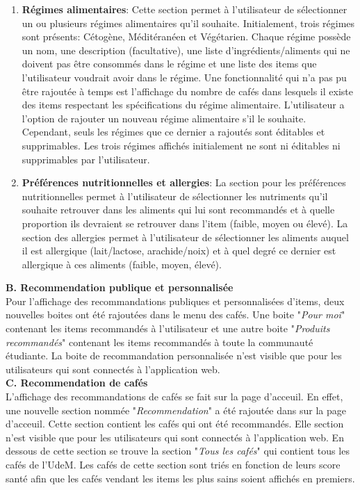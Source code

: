 \documentclass[11pt]{article}
\begin{document}
\begin{enumerate}
	\item \textbf{Régimes alimentaires}: Cette section permet à l'utilisateur de sélectionner un ou plusieurs régimes alimentaires qu'il souhaite. Initialement, trois régimes sont présents: Cétogène, Méditéranéen et Végétarien. Chaque régime possède un nom, une description (facultative), une liste d'ingrédients/aliments qui ne doivent pas être consommés dans le régime et une liste des items que l'utilisateur voudrait avoir dans le régime. Une fonctionnalité qui n'a pas pu être rajoutée à temps est l'affichage du nombre de cafés dans lesquels il existe des items respectant les spécifications du régime alimentaire. L'utilisateur a l'option de rajouter un nouveau régime alimentaire s'il le souhaite. Cependant, seuls les régimes que ce dernier a rajoutés sont éditables et supprimables. Les trois régimes affichés initialement ne sont ni éditables ni supprimables par l'utilisateur.\\
	
	 \item \textbf{Préférences nutritionnelles et allergies}: La section pour les préférences nutritionnelles permet à l'utilisateur de sélectionner les nutriments qu'il souhaite retrouver dans les aliments qui lui sont recommandés et à quelle proportion ils devraient se retrouver dans l'item (faible, moyen ou élevé). La section des allergies permet à l'utilisateur de sélectionner les aliments auquel il est allergique (lait/lactose, arachide/noix) et à quel degré ce dernier est allergique à ces aliments (faible, moyen, élevé).\\
\end{enumerate}

\textbf{B. Recommendation publique et personnalisée}\\
Pour l'affichage des recommandations publiques et personnalisées d'items, deux nouvelles boites ont été rajoutées dans le menu des cafés. Une boite "\textit{Pour moi}" contenant les items recommandés à l'utilisateur et une autre boite "\textit{Produits recommandés}" contenant les items recommandés à toute la communauté étudiante. La boite de recommandation personnalisée n'est visible que pour les utilisateurs qui sont connectés à l'application web.\\

\textbf{C. Recommendation de cafés}\\
L'affichage des recommandations de cafés se fait sur la page d'acceuil. En effet, une nouvelle section nommée "\textit{Recommendation}" a été rajoutée dans sur la page d'acceuil. Cette section contient les cafés qui ont été recommandés. Elle section n'est visible que pour les utilisateurs qui sont connectés à l'application web. En dessous de cette section se trouve la section "\textit{Tous les cafés}" qui contient tous les cafés de l'UdeM. Les cafés de cette section sont triés en fonction de leurs score santé afin que les cafés vendant les items les plus sains soient affichés en premiers.\\
\end{document}
